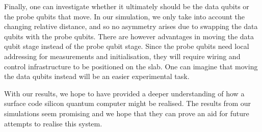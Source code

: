 Finally, one can investigate whether it ultimately should be the data qubits or the probe qubits that  move. In our simulation, we only take into account the changing relative distance, and so no asymmetry arises due to swapping the data qubits with the probe qubits. There are however advantages in moving the data qubit stage instead of the probe qubit stage. Since the probe qubits need local addressing for measurements and initialisation, they will require wiring and control infrastructure to be positioned on the slab. One can imagine that moving the data qubits instead will be an easier experimental task. 

With our results, we hope to have provided a deeper understanding of how a surface code silicon quantum computer might be realised. The results from our simulations seem promising and we hope that they can prove an aid for future attempts to realise this system. 













